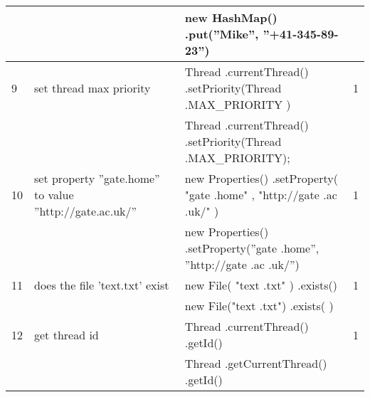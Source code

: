 \begin{longtable}{|p{}|p{}|p{}|p{}|}
		\rowcolor[HTML]{9AFF99} 
		&                                                        & new HashMap() .put(”Mike”, ”+41-345-89-23”)                                                                      &                                         \\ \hline
		\rowcolor[HTML]{FFCCC9} 
		9                                 & set thread max priority                                & Thread .currentThread() .setPriority(Thread .MAX\_PRIORITY )                                                     & 1                                       \\ \hline
		\rowcolor[HTML]{9AFF99} 
		&                                                        & Thread .currentThread() .setPriority(Thread .MAX\_PRIORITY);                                                     &                                         \\ \hline
		\rowcolor[HTML]{FFCCC9} 
		10                                & set property ”gate.home” to value ”http://gate.ac.uk/” & new Properties() .setProperty( "gate .home" , "http://gate .ac .uk/" )                                           & 1                                       \\ \hline
		\rowcolor[HTML]{9AFF99} 
		&                                                        & new Properties() .setProperty(”gate .home”, ”http://gate .ac .uk/”)                                              &                                         \\ \hline
		\rowcolor[HTML]{FFCCC9} 
		11                                & does the file 'text.txt' exist                         & new File( "text .txt" )  .exists()                                                                               & 1                                       \\ \hline
		\rowcolor[HTML]{9AFF99} 
		&                                                        & new File("text .txt") .exists( )                                                                                 &                                         \\ \hline
		\rowcolor[HTML]{FFCCC9} 
		12                                & get thread id                                          & Thread .currentThread() .getId()                                                                                 & 1                                       \\ \hline
		\rowcolor[HTML]{9AFF99} 
		&                                                        & Thread .getCurrentThread() .getId()                                                                              &                                         \\ \hline

\end{longtable}
